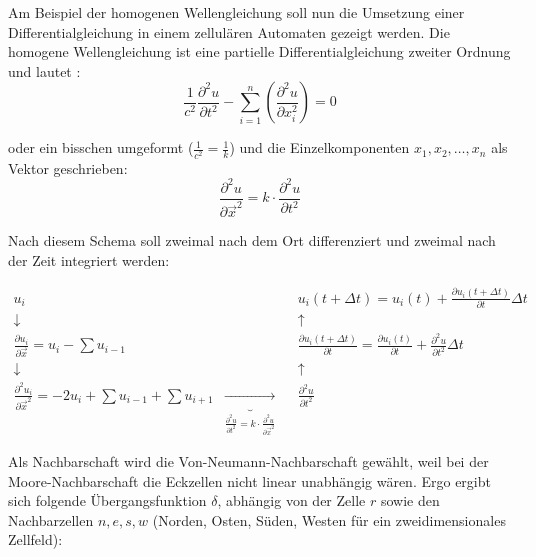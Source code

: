 \documentclass[11pt]{scrreprt} %
\theoremstyle{definition}
\begin{document}
Am Beispiel der homogenen Wellengleichung soll nun die Umsetzung einer Differentialgleichung in einem zellulären Automaten gezeigt werden. Die homogene Wellengleichung ist eine partielle Differentialgleichung zweiter Ordnung und lautet \cite{wiki:Wellengleichung}:
\[
\frac 1 {c^2} \frac{\partial^2 u}{\partial t^2}-\sum_{i=1}^{n} \left( \frac{\partial^2 u}{\partial x_i^2} \right)  = 0
\]

oder ein bisschen umgeformt ($\frac 1 {c^2} = \frac 1 k$) und die Einzelkomponenten $x_1, x_2, \dots, x_n$ als Vektor geschrieben:
\[
\frac {\partial^2 u} {\partial \vec x^2} = k \cdot \frac {\partial^2 u}{\partial t^2}
\]

Nach diesem Schema soll zweimal nach dem Ort differenziert und zweimal nach der Zeit integriert werden:

\begin{align*}
u_i &&& u_i(t+\Delta t) = u_i(t) +  \frac{\partial u_i(t+\Delta t)}{\partial t}\Delta t \\
\downarrow &&& \uparrow \\
\frac{\partial u_i}{\partial \vec x} = u_i - \sum u_{i-1} &&& \frac{\partial u_i(t+\Delta t)}{\partial t} = \frac{\partial u_i(t)}{\partial t} + \frac{\partial^2 u}{\partial t^2}\Delta t \\
\downarrow &&& \uparrow \\
\frac{\partial^2 u_i}{\partial \vec x^2} = -2u_i + \sum u_{i-1} + \sum u_{i+1} & \underbrace{\longrightarrow}_{\frac{\partial^2 u}{\partial t^2} = k\cdot \frac{\partial^2 u}{\partial \vec{x}^2}} && \frac{\partial^2 u}{\partial t^2}
\end{align*}

Als Nachbarschaft wird die Von-Neumann-Nachbarschaft gewählt, weil bei der Moore-Nachbarschaft die Eckzellen nicht linear unabhängig wären. Ergo ergibt sich folgende Übergangsfunktion $\delta$, abhängig von der Zelle $r$ sowie den Nachbarzellen $n, e, s, w$ (Norden, Osten, Süden, Westen für ein zweidimensionales Zellfeld):
\end{document}
